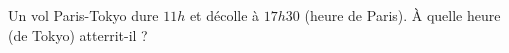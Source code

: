 
\begin{exercice}\label{exo2smath-0241}

    Un vol Paris-Tokyo dure \( 11h\) et décolle à \( 17h30\) (heure de Paris). À quelle heure (de Tokyo) atterrit-il ?

\end{exercice}

